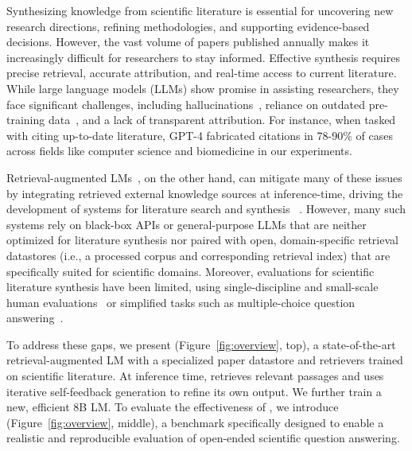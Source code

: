 Synthesizing knowledge from scientific literature is essential for uncovering new research directions, refining methodologies, and supporting evidence-based decisions. However, the vast volume of papers published annually makes it increasingly difficult for researchers to stay informed. Effective synthesis requires precise retrieval, accurate attribution, and real-time access to current literature. 
While large language models (LLMs) show promise in assisting researchers, they face significant challenges, including hallucinations~\citep{mallen2022not,mishra2024finegrained}, reliance on outdated pre-training data~\citep{kasai2022realtime}, and a lack of transparent attribution. For instance, when tasked with citing up-to-date literature, GPT-4 fabricated citations in 78-90\% of cases across fields like computer science and biomedicine in our experiments. 

Retrieval-augmented LMs~\citep{lewis2020retrieval,guu2020retrieval}, on the other hand, can mitigate many of these issues by integrating retrieved external knowledge sources at inference-time, driving the development of systems for literature search and synthesis ~\citep{agarwal2024litllm,zheng2024openresearcher,skarlinski2024language}. 
However, many such systems rely on black-box APIs or general-purpose LLMs that are neither optimized for literature synthesis nor paired with open, domain-specific retrieval datastores (i.e., a processed corpus and corresponding retrieval index) that are specifically suited for scientific domains. 
Moreover, evaluations for scientific literature synthesis have been limited, using single-discipline and small-scale human evaluations~\citep{agarwal2024litllm,zheng2024openresearcher} or simplified tasks such as multiple-choice question answering~\citep{skarlinski2024language}. 

To address these gaps, we present \model (Figure~\ref{fig:overview}, top), a state-of-the-art retrieval-augmented LM with a specialized paper datastore and retrievers trained on scientific literature. At inference time, \model retrieves relevant passages and uses iterative self-feedback generation to refine its own output. 
We further train a new, efficient 8B LM. 
To evaluate the effectiveness of \model, we introduce \data (Figure~\ref{fig:overview}, middle), a benchmark specifically designed to enable a realistic and reproducible evaluation of open-ended scientific question answering.


